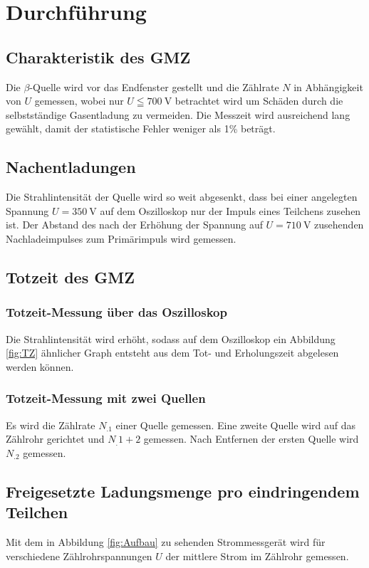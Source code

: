 \section{Durchführung}
\label{sec:Durchführung}

\subsection{Charakteristik des GMZ}
Die $\beta$-Quelle wird vor das Endfenster gestellt und die Zählrate $N$ in Abhängigkeit von $U$ gemessen, wobei nur $U\leqq \SI{700}{\volt}$ betrachtet wird um Schäden durch die selbstständige Gasentladung zu vermeiden. Die Messzeit wird ausreichend lang gewählt, damit der statistische Fehler weniger als 1\% beträgt.

\subsection{Nachentladungen}
Die Strahlintensität der Quelle wird so weit abgesenkt, dass bei einer angelegten Spannung $U=\SI{350}{\volt}$ auf dem Oszilloskop nur der Impuls eines Teilchens zusehen ist. Der Abstand des nach der Erhöhung der Spannung auf $U=\SI{710}{\volt}$ zusehenden Nachladeimpulses zum Primärimpuls wird gemessen.

\subsection{Totzeit des GMZ}
\subsubsection{Totzeit-Messung über das Oszilloskop}
Die Strahlintensität wird erhöht, sodass auf dem Oszilloskop ein Abbildung \ref{fig:TZ} ähnlicher Graph entsteht aus dem Tot- und Erholungszeit abgelesen werden können.
\subsubsection{Totzeit-Messung mit zwei Quellen}
Es wird die Zählrate $N_.1$ einer Quelle gemessen.
Eine zweite Quelle wird auf das Zählrohr gerichtet und $N_.{1+2}$ gemessen.
Nach Entfernen der ersten Quelle wird $N_.2$ gemessen.
\subsection{Freigesetzte Ladungsmenge pro eindringendem Teilchen}
Mit dem in Abbildung \ref{fig:Aufbau} zu sehenden Strommessgerät wird für verschiedene Zählrohrspannungen $U$ der mittlere Strom im Zählrohr gemessen.